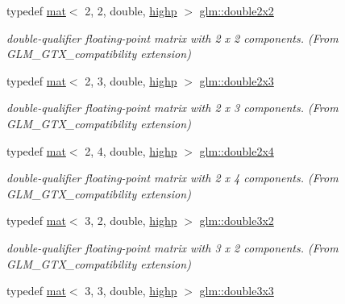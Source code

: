 \begin{DoxyCompactItemize}
typedef \mbox{\hyperlink{structglm_1_1mat}{mat}}$<$ 2, 2, double, \mbox{\hyperlink{namespaceglm_a36ed105b07c7746804d7fdc7cc90ff25ac6f7eab42eacbb10d59a58e95e362074}{highp}} $>$ \mbox{\hyperlink{group__gtx__compatibility_ga38235425d2401904456ecbc342d87453}{glm\+::double2x2}}
\begin{DoxyCompactList}\small\item\em double-\/qualifier floating-\/point matrix with 2 x 2 components. (From G\+L\+M\+\_\+\+G\+T\+X\+\_\+compatibility extension) \end{DoxyCompactList}\item 
typedef \mbox{\hyperlink{structglm_1_1mat}{mat}}$<$ 2, 3, double, \mbox{\hyperlink{namespaceglm_a36ed105b07c7746804d7fdc7cc90ff25ac6f7eab42eacbb10d59a58e95e362074}{highp}} $>$ \mbox{\hyperlink{group__gtx__compatibility_gaaf4151b4dcb70d412df4c4a1cfccd575}{glm\+::double2x3}}
\begin{DoxyCompactList}\small\item\em double-\/qualifier floating-\/point matrix with 2 x 3 components. (From G\+L\+M\+\_\+\+G\+T\+X\+\_\+compatibility extension) \end{DoxyCompactList}\item 
typedef \mbox{\hyperlink{structglm_1_1mat}{mat}}$<$ 2, 4, double, \mbox{\hyperlink{namespaceglm_a36ed105b07c7746804d7fdc7cc90ff25ac6f7eab42eacbb10d59a58e95e362074}{highp}} $>$ \mbox{\hyperlink{group__gtx__compatibility_ga64a5113afe95db296ff0593232ac772d}{glm\+::double2x4}}
\begin{DoxyCompactList}\small\item\em double-\/qualifier floating-\/point matrix with 2 x 4 components. (From G\+L\+M\+\_\+\+G\+T\+X\+\_\+compatibility extension) \end{DoxyCompactList}\item 
typedef \mbox{\hyperlink{structglm_1_1mat}{mat}}$<$ 3, 2, double, \mbox{\hyperlink{namespaceglm_a36ed105b07c7746804d7fdc7cc90ff25ac6f7eab42eacbb10d59a58e95e362074}{highp}} $>$ \mbox{\hyperlink{group__gtx__compatibility_ga92075f3b0988e062b5fcd25afb67e74c}{glm\+::double3x2}}
\begin{DoxyCompactList}\small\item\em double-\/qualifier floating-\/point matrix with 3 x 2 components. (From G\+L\+M\+\_\+\+G\+T\+X\+\_\+compatibility extension) \end{DoxyCompactList}\item 
typedef \mbox{\hyperlink{structglm_1_1mat}{mat}}$<$ 3, 3, double, \mbox{\hyperlink{namespaceglm_a36ed105b07c7746804d7fdc7cc90ff25ac6f7eab42eacbb10d59a58e95e362074}{highp}} $>$ \mbox{\hyperlink{group__gtx__compatibility_ga7cf33790969e0985a53ff01d914bf8ef}{glm\+::double3x3}}

\end{DoxyCompactItemize}
